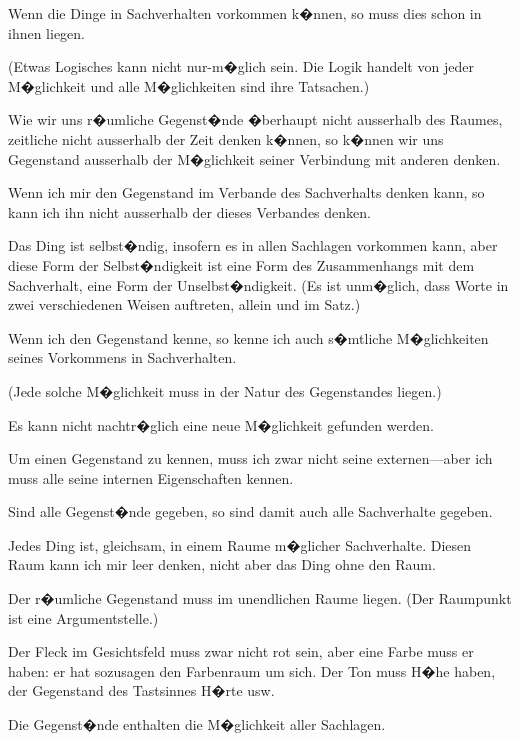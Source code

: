 \begin{propositions}
{Wenn die Dinge in Sachverhalten vorkommen
k�nnen, so muss dies schon in ihnen liegen.

(Etwas Logisches kann nicht nur-m�glich sein.
Die Logik handelt von jeder M�glichkeit und alle
M�glichkeiten sind ihre Tatsachen.)

Wie wir uns r�umliche Gegenst�nde �berhaupt
nicht ausserhalb des Raumes, zeitliche nicht ausserhalb
der Zeit denken k�nnen, so k�nnen wir uns
 Gegenstand ausserhalb der M�glichkeit
seiner Verbindung mit anderen denken.

Wenn ich mir den Gegenstand im Verbande
des Sachverhalts denken kann, so kann ich ihn
nicht ausserhalb der  dieses Verbandes
denken.}


{Das Ding ist selbst�ndig, insofern es in allen
 Sachlagen vorkommen kann, aber
diese Form der Selbst�ndigkeit ist eine Form des
Zusammenhangs mit dem Sachverhalt, eine Form
der Unselbst�ndigkeit. (Es ist unm�glich, dass
Worte in zwei verschiedenen Weisen auftreten,
allein und im Satz.)}


{Wenn ich den Gegenstand kenne, so kenne ich
auch s�mtliche M�glichkeiten seines Vorkommens
in Sachverhalten.

(Jede solche M�glichkeit muss in der Natur des
Gegenstandes liegen.)

Es kann nicht nachtr�glich eine neue M�glichkeit
gefunden werden.}


{Um einen Gegenstand zu kennen, muss ich zwar
nicht seine externen---aber ich muss alle seine
internen Eigenschaften kennen.}


{Sind alle Gegenst�nde gegeben, so sind damit
auch alle  Sachverhalte gegeben.}


{Jedes Ding ist, gleichsam, in einem Raume
m�glicher Sachverhalte. Diesen Raum kann ich
mir leer denken, nicht aber das Ding ohne den
Raum.}


{Der r�umliche Gegenstand muss im unendlichen
Raume liegen. (Der Raumpunkt ist eine Argumentstelle.)

Der Fleck im Gesichtsfeld muss zwar nicht rot
sein, aber eine Farbe muss er haben: er hat sozusagen
den Farbenraum um sich. Der Ton muss
 H�he haben, der Gegenstand des Tastsinnes
 H�rte usw.}


{Die Gegenst�nde enthalten die M�glichkeit aller
Sachlagen.}



\end{propositions}
